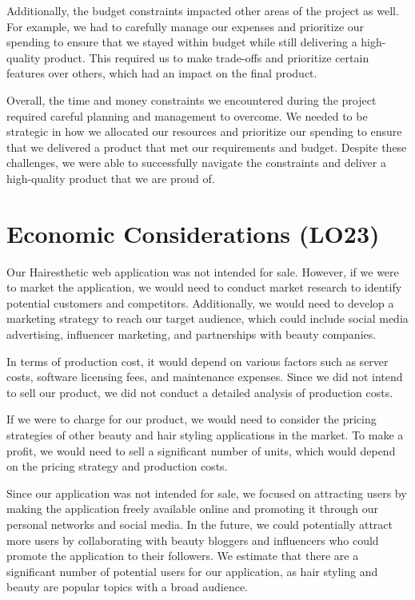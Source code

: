 \documentclass{article}
\begin{document}
Additionally, the budget constraints impacted other areas of the project as well. For example, we had to carefully manage our expenses and prioritize our spending to ensure that we stayed within budget while still delivering a high-quality product. This required us to make trade-offs and prioritize certain features over others, which had an impact on the final product.

Overall, the time and money constraints we encountered during the project required careful planning and management to overcome. We needed to be strategic in how we allocated our resources and prioritize our spending to ensure that we delivered a product that met our requirements and budget. Despite these challenges, we were able to successfully navigate the constraints and deliver a high-quality product that we are proud of.
 

\section{Economic Considerations (LO23)}

Our Hairesthetic web application was not intended for sale. However, if we were to market the application, we would need to conduct market research to identify potential customers and competitors. Additionally, we would need to develop a marketing strategy to reach our target audience, which could include social media advertising, influencer marketing, and partnerships with beauty companies.

In terms of production cost, it would depend on various factors such as server costs, software licensing fees, and maintenance expenses. Since we did not intend to sell our product, we did not conduct a detailed analysis of production costs.

If we were to charge for our product, we would need to consider the pricing strategies of other beauty and hair styling applications in the market. To make a profit, we would need to sell a significant number of units, which would depend on the pricing strategy and production costs.

Since our application was not intended for sale, we focused on attracting users by making the application freely available online and promoting it through our personal networks and social media. In the future, we could potentially attract more users by collaborating with beauty bloggers and influencers who could promote the application to their followers. We estimate that there are a significant number of potential users for our application, as hair styling and beauty are popular topics with a broad audience.
\end{document}
